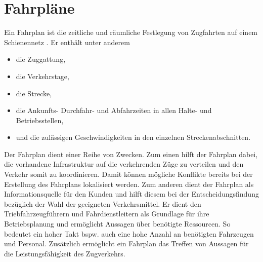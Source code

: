 \section{Fahrpläne}

Ein Fahrplan ist die zeitliche und räumliche Festlegung von Zugfahrten auf einem Schienennetz \cite{groger_simulation_2002}. Er enthält unter anderem
\begin{itemize}
    \item die Zuggattung,
    \item die Verkehrstage,
    \item die Strecke,
    \item die Ankunfts- Durchfahr- und Abfahrzeiten in allen Halte- und Betriebsstellen,
    \item und die zulässigen Geschwindigkeiten in den einzelnen Streckenabschnitten.
\end{itemize}
Der Fahrplan dient einer Reihe von Zwecken. Zum einen hilft der Fahrplan dabei, die vorhandene Infrastruktur auf die verkehrenden Züge zu verteilen und den Verkehr somit zu koordinieren. Damit können mögliche Konflikte bereits bei der Erstellung des Fahrplans lokalisiert werden. Zum anderen dient der Fahrplan als Informationsquelle für den Kunden und hilft diesem bei der Entscheidungsfindung bezüglich der Wahl der geeigneten Verkehrsmittel. Er dient den Triebfahrzeugführern und Fahrdienstleitern als Grundlage für ihre Betriebsplanung und ermöglicht Aussagen über benötigte Ressourcen. So bedeutet ein hoher Takt bspw. auch eine hohe Anzahl an benötigten Fahrzeugen und Personal. Zusätzlich ermöglicht ein Fahrplan das Treffen von Aussagen für die Leistungsfähigkeit des Zugverkehrs. \cite{groger_simulation_2002}
